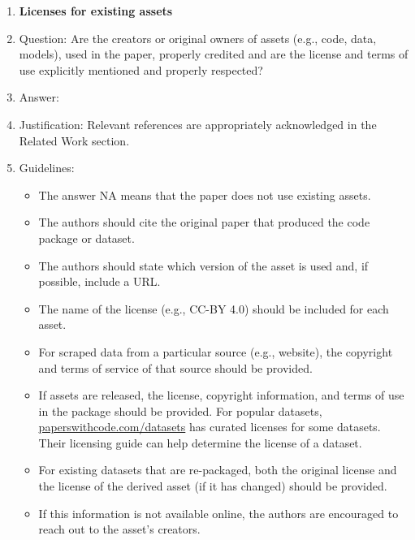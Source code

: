 \documentclass{article}
\begin{document}
\begin{enumerate}
\item {\bf Licenses for existing assets}
    \item[] Question: Are the creators or original owners of assets (e.g., code, data, models), used in the paper, properly credited and are the license and terms of use explicitly mentioned and properly respected?
    \item[] Answer: \answerYes{} %
    \item[] Justification: Relevant references are appropriately acknowledged in the Related Work section.
    \item[] Guidelines:
    \begin{itemize}
        \item The answer NA means that the paper does not use existing assets.
        \item The authors should cite the original paper that produced the code package or dataset.
        \item The authors should state which version of the asset is used and, if possible, include a URL.
        \item The name of the license (e.g., CC-BY 4.0) should be included for each asset.
        \item For scraped data from a particular source (e.g., website), the copyright and terms of service of that source should be provided.
        \item If assets are released, the license, copyright information, and terms of use in the package should be provided. For popular datasets, \url{paperswithcode.com/datasets} has curated licenses for some datasets. Their licensing guide can help determine the license of a dataset.
        \item For existing datasets that are re-packaged, both the original license and the license of the derived asset (if it has changed) should be provided.
        \item If this information is not available online, the authors are encouraged to reach out to the asset's creators.
    \end{itemize}


\end{enumerate}
\end{document}
